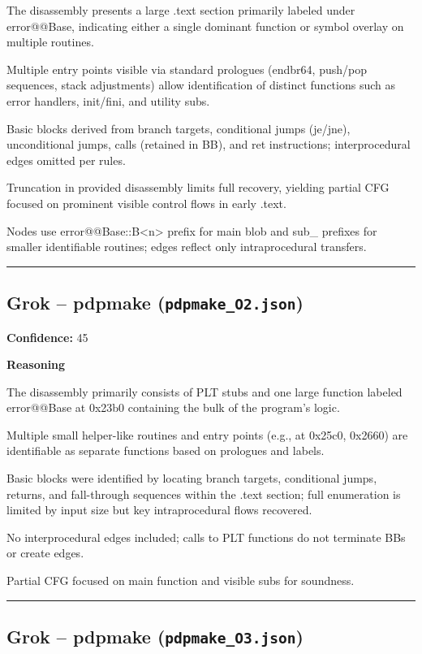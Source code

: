 The disassembly presents a large .text section primarily labeled under error@@Base, indicating either a single dominant function or symbol overlay on multiple routines.

Multiple entry points visible via standard prologues (endbr64, push/pop sequences, stack adjustments) allow identification of distinct functions such as error handlers, init/fini, and utility subs.

Basic blocks derived from branch targets, conditional jumps (je/jne), unconditional jumps, calls (retained in BB), and ret instructions; interprocedural edges omitted per rules.

Truncation in provided disassembly limits full recovery, yielding partial CFG focused on prominent visible control flows in early .text.

Nodes use error@@Base::B<n> prefix for main blob and sub\_ prefixes for smaller identifiable routines; edges reflect only intraprocedural transfers.

\bigskip
\hrule
\bigskip

\subsection{Grok -- pdpmake (\texttt{pdpmake\_O2.json})}

\textbf{Confidence:} 45

\textbf{Reasoning}

The disassembly primarily consists of PLT stubs and one large function labeled error@@Base at 0x23b0 containing the bulk of the program's logic.

Multiple small helper-like routines and entry points (e.g., at 0x25c0, 0x2660) are identifiable as separate functions based on prologues and labels.

Basic blocks were identified by locating branch targets, conditional jumps, returns, and fall-through sequences within the .text section; full enumeration is limited by input size but key intraprocedural flows recovered.

No interprocedural edges included; calls to PLT functions do not terminate BBs or create edges.

Partial CFG focused on main function and visible subs for soundness.

\bigskip
\hrule
\bigskip

\subsection{Grok -- pdpmake (\texttt{pdpmake\_O3.json})}

